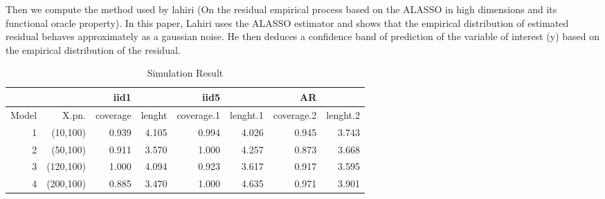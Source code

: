 \documentclass[11pt,oneside, a4paper]{amsart}\usepackage[]{graphicx}\usepackage[]{color}
\begin{document}
Then we compute the method used by lahiri (On the residual empirical process based on the ALASSO in high dimensions and its functional oracle property). In this paper, Lahiri uses the ALASSO estimator and shows that the empirical distribution of estimated residual behaves approximately as a gaussian noise. He then deduces a confidence band of prediction of the variable of interest (y) based on the empirical distribution of the residual.





\begin{table}[ht]
\centering
\caption{Simulation Result} 
\label{Test_table}
{\footnotesize
\begin{tabular}{|r|r|rr|rr|rr|}
  \toprule 
    &  & iid1 &  & iid5 & & AR & \\
 \midrule 
Model & X.pn. & coverage & lenght & coverage.1 & lenght.1 & coverage.2 & lenght.2 \\ 
    1 & (10,100) & 0.939 & 4.105 & 0.994 & 4.026 & 0.945 & 3.743 \\ 
     2 & (50,100) & 0.911 & 3.570 & 1.000 & 4.257 & 0.873 & 3.668 \\ 
     3 & (120,100) & 1.000 & 4.094 & 0.923 & 3.617 & 0.917 & 3.595 \\ 
     4 & (200,100) & 0.885 & 3.470 & 1.000 & 4.635 & 0.971 & 3.901 \\ 
   \bottomrule 
\end{tabular}
}
\end{table}
\end{document}
